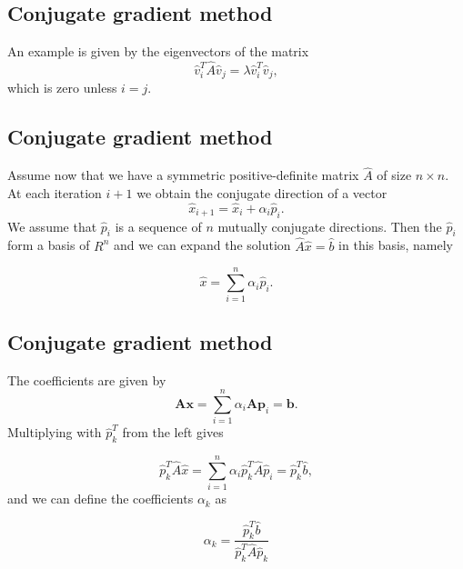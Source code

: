 \documentclass[%
oneside,                 %
final,                   %
10pt]{article}
\begin{document}
\subsection{Conjugate gradient method}
\begin{block}{}
An example is given by the eigenvectors of the matrix
\begin{equation*}
\hat{v}_i^T\hat{A}\hat{v}_j= \lambda\hat{v}_i^T\hat{v}_j,
\end{equation*}
which is zero unless $i=j$. 
\end{block}

\subsection{Conjugate gradient method}
\begin{block}{}
Assume now that we have a symmetric positive-definite matrix $\hat{A}$ of size
$n\times n$. At each iteration $i+1$ we obtain the conjugate direction of a vector
\begin{equation*}
\hat{x}_{i+1}=\hat{x}_{i}+\alpha_i\hat{p}_{i}. 
\end{equation*}
We assume that $\hat{p}_{i}$ is a sequence of $n$ mutually conjugate directions. 
Then the $\hat{p}_{i}$  form a basis of $R^n$ and we can expand the solution 
$  \hat{A}\hat{x} = \hat{b}$ in this basis, namely

\begin{equation*}
  \hat{x}  = \sum^{n}_{i=1} \alpha_i \hat{p}_i.
\end{equation*}
\end{block}

\subsection{Conjugate gradient method}
\begin{block}{}
The coefficients are given by
\begin{equation*}
    \mathbf{A}\mathbf{x} = \sum^{n}_{i=1} \alpha_i \mathbf{A} \mathbf{p}_i = \mathbf{b}.
\end{equation*}
Multiplying with $\hat{p}_k^T$  from the left gives

\begin{equation*}
  \hat{p}_k^T \hat{A}\hat{x} = \sum^{n}_{i=1} \alpha_i\hat{p}_k^T \hat{A}\hat{p}_i= \hat{p}_k^T \hat{b},
\end{equation*}
and we can define the coefficients $\alpha_k$ as

\begin{equation*}
    \alpha_k = \frac{\hat{p}_k^T \hat{b}}{\hat{p}_k^T \hat{A} \hat{p}_k}
\end{equation*}
\end{block}
\end{document}
